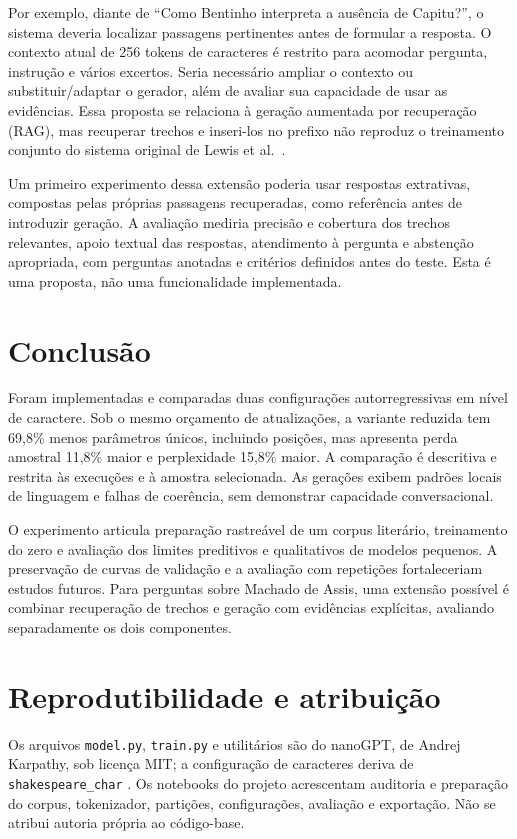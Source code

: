 \documentclass[conference]{IEEEtran}
\begin{document}
Por exemplo, diante de ``Como Bentinho interpreta a ausência de Capitu?'', o sistema deveria localizar passagens pertinentes antes de formular a resposta. O contexto atual de 256 tokens de caracteres é restrito para acomodar pergunta, instrução e vários excertos. Seria necessário ampliar o contexto ou substituir/adaptar o gerador, além de avaliar sua capacidade de usar as evidências. Essa proposta se relaciona à geração aumentada por recuperação (RAG), mas recuperar trechos e inseri-los no prefixo não reproduz o treinamento conjunto do sistema original de Lewis et al.\ \cite{lewis2020rag}.

Um primeiro experimento dessa extensão poderia usar respostas extrativas, compostas pelas próprias passagens recuperadas, como referência antes de introduzir geração. A avaliação mediria precisão e cobertura dos trechos relevantes, apoio textual das respostas, atendimento à pergunta e abstenção apropriada, com perguntas anotadas e critérios definidos antes do teste. Esta é uma proposta, não uma funcionalidade implementada.

\section{Conclusão}

Foram implementadas e comparadas duas configurações autorregressivas em nível de caractere. Sob o mesmo orçamento de atualizações, a variante reduzida tem 69,8\% menos parâmetros únicos, incluindo posições, mas apresenta perda amostral 11,8\% maior e perplexidade 15,8\% maior. A comparação é descritiva e restrita às execuções e à amostra selecionada. As gerações exibem padrões locais de linguagem e falhas de coerência, sem demonstrar capacidade conversacional.

O experimento articula preparação rastreável de um corpus literário, treinamento do zero e avaliação dos limites preditivos e qualitativos de modelos pequenos. A preservação de curvas de validação e a avaliação com repetições fortaleceriam estudos futuros. Para perguntas sobre Machado de Assis, uma extensão possível é combinar recuperação de trechos e geração com evidências explícitas, avaliando separadamente os dois componentes.

\section*{Reprodutibilidade e atribuição}

Os arquivos \texttt{model.py}, \texttt{train.py} e utilitários são do nanoGPT, de Andrej Karpathy, sob licença MIT; a configuração de caracteres deriva de \texttt{shakespeare\_char} \cite{karpathyNanoGPT}. Os notebooks do projeto acrescentam auditoria e preparação do corpus, tokenizador, partições, configurações, avaliação e exportação. Não se atribui autoria própria ao código-base.
\end{document}
